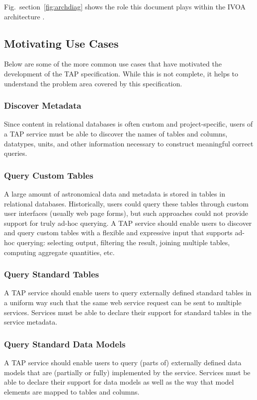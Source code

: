 \documentclass[11pt,letter]{ivoa}
\begin{document}
Fig.~section~\ref{fig:archdiag} shows the role this document plays within the
IVOA architecture \citep{note:VOARCH}.

\subsection{Motivating Use Cases}
Below are some of the more common use cases that have motivated the development 
of the TAP specification. While this is not complete, it helps to understand the 
problem area covered by this specification.

\subsubsection{Discover Metadata}
Since content in relational databases is often custom and project-specific, 
users of a TAP service must be able to discover the names of tables and 
columns, datatypes, units, and other information necessary to construct 
meaningful correct queries.

\subsubsection{Query Custom Tables}
A large amount of astronomical data and metadata is stored in tables in 
relational databases. Historically, users could query these tables through 
custom user interfaces (usually web page forms), but such approaches could not 
provide support for truly ad-hoc querying. A TAP service should enable users to 
discover and query custom tables with a flexible and expressive input that 
supports ad-hoc querying: selecting output, filtering the result, joining 
multiple tables, computing aggregate quantities, etc. 

\subsubsection{Query Standard Tables}
A TAP service should enable users to query externally defined standard tables 
in a uniform way such that the same web service request can be sent to multiple 
services. Services must be able to declare their support for standard tables in 
the service metadata.

\subsubsection{Query Standard Data Models}
A TAP service should enable users to query (parts of) externally defined data 
models that are (partially or fully) implemented by the service. Services must 
be able to declare their support for data models as well as the way that model 
elements are mapped to tables and columns.
\end{document}
